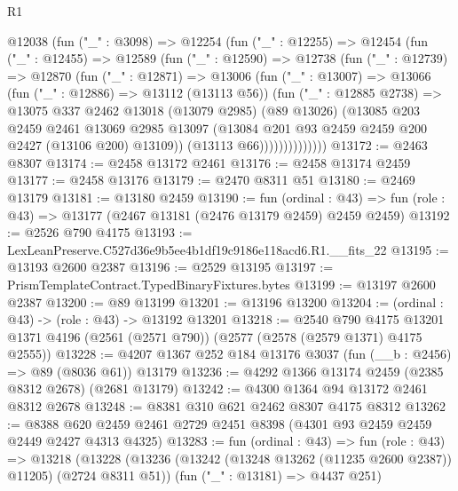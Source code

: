 \begin{lexlean}{R1}
\begin{coremodule}
            @12038
              (fun ("_" : @3098) =>
              @12254
                (fun ("_" : @12255) =>
                @12454
                  (fun ("_" : @12455) =>
                  @12589
                    (fun ("_" : @12590) =>
                    @12738
                      (fun ("_" : @12739) =>
                      @12870
                        (fun ("_" : @12871) =>
                        @13006
                          (fun ("_" : @13007) =>
                          @13066
                            (fun ("_" : @12886) => @13112 (@13113 @56))
                            (fun ("_" : @12885 @2738) =>
                            @13075
                              @337
                              @2462
                              @13018
                              (@13079 @2985)
                              (@89 @13026)
                              (@13085
                                @203
                                @2459
                                @2461
                                @13069
                                @2985
                                @13097
                                (@13084 @201 @93 @2459 @2459 @200 @2427 (@13106 @200) @13109))
                              (@13113 @66))))))))))))))
@13172 := @2463 @8307
@13174 := @2458 @13172 @2461
@13176 := @2458 @13174 @2459
@13177 := @2458 @13176
@13179 := @2470 @8311 @51
@13180 := @2469 @13179
@13181 := @13180 @2459
@13190 := fun (ordinal : @43) =>
  fun (role : @43) => @13177 (@2467 @13181 (@2476 @13179 @2459) @2459 @2459)
@13192 := @2526 @790 @4175
@13193 := LexLeanPreserve.C527d36e9b5ee4b1df19c9186e118acd6.R1.__fits_22
@13195 := @13193 @2600 @2387
@13196 := @2529 @13195
@13197 := PrismTemplateContract.TypedBinaryFixtures.bytes
@13199 := @13197 @2600 @2387
@13200 := @89 @13199
@13201 := @13196 @13200
@13204 := (ordinal : @43) -> (role : @43) -> @13192 @13201
@13218 := @2540
    @790
    @4175
    @13201
    @1371
    @4196
    (@2561 (@2571 @790))
    (@2577 (@2578 (@2579 @1371) @4175 @2555))
@13228 := @4207 @1367 @252 @184 @13176 @3037 (fun (__b : @2456) => @89 (@8036 @61)) @13179
@13236 := @4292 @1366 @13174 @2459 (@2385 @8312 @2678) (@2681 @13179)
@13242 := @4300 @1364 @94 @13172 @2461 @8312 @2678
@13248 := @8381 @310 @621 @2462 @8307 @4175 @8312
@13262 := @8388 @620 @2459 @2461 @2729 @2451 @8398 (@4301 @93 @2459 @2459 @2449 @2427 @4313 @4325)
@13283 := fun (ordinal : @43) =>
  fun (role : @43) =>
  @13218
    (@13228
      (@13236 (@13242 (@13248 @13262 (@11235 @2600 @2387)) @11205) (@2724 @8311 @51))
      (fun ("_" : @13181) => @4437 @251)

\end{coremodule}
\end{lexlean}

